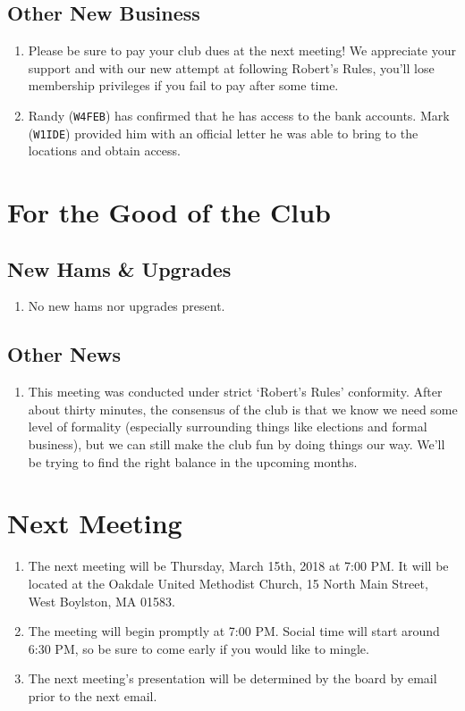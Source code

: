 \documentclass[10pt,letterpaper]{article}
\begin{document}
\subsection{Other New Business}
\begin{enumerate}
  \item Please be sure to pay your club dues at the next meeting! We appreciate your support and with our new attempt at following Robert's Rules, you'll lose membership privileges if you fail to pay after some time.
  \item Randy (\texttt{W4FEB}) has confirmed that he has access to the bank accounts. Mark (\texttt{W1IDE}) provided him with an official letter he was able to bring to the locations and obtain access.
\end{enumerate}

\section{For the Good of the Club}

\subsection{New Hams \& Upgrades}
\begin{enumerate}
  \item No new hams nor upgrades present.
\end{enumerate}

\subsection{Other News}
\begin{enumerate}
  \item This meeting was conducted under strict `Robert's Rules' conformity. After about thirty minutes, the consensus of the club is that we know we need some level of formality (especially surrounding things like elections and formal business), but we can still make the club fun by doing things our way. We'll be trying to find the right balance in the upcoming months.
\end{enumerate}

\section{Next Meeting}
\begin{enumerate}
  \item The next meeting will be Thursday, March 15th, 2018 at 7:00 PM. It will be located at the Oakdale United Methodist Church, 15 North Main Street, West Boylston, MA 01583.
  \item The meeting will begin promptly at 7:00 PM. Social time will start around 6:30 PM, so be sure to come early if you would like to mingle.
  \item The next meeting's presentation will be determined by the board by email prior to the next email.
\end{enumerate}
\end{document}

